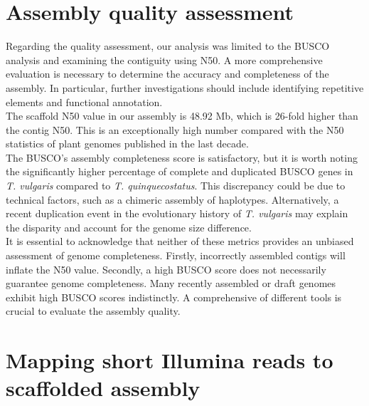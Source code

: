 \section*{Assembly quality assessment}

Regarding the quality assessment, our analysis was limited to the BUSCO analysis and examining the contiguity using N50. A more comprehensive evaluation is necessary to determine the accuracy and completeness of the assembly. In particular, further investigations should include identifying repetitive elements and functional annotation.\\

The scaffold N50 value in our assembly is 48.92 Mb, which is 26-fold higher than the contig N50. This is an exceptionally high number compared with the N50 statistics of plant genomes published in the last decade.~\cite{sunTwentyYearsPlant2022a}\\

The BUSCO's assembly completeness score is satisfactory, but it is worth noting the significantly higher percentage of complete and duplicated BUSCO genes in \textit{T. vulgaris} compared to \textit{T. quinquecostatus}. This discrepancy could be due to technical factors, such as a chimeric assembly of haplotypes. Alternatively, a recent duplication event in the evolutionary history of \textit{T. vulgaris} may explain the disparity and account for the genome size difference.~\cite{manniBUSCOAssessingGenomic2021}\\

It is essential to acknowledge that neither of these metrics provides an unbiased assessment of genome completeness. Firstly, incorrectly assembled contigs will inflate the N50 value. Secondly, a high BUSCO score does not necessarily guarantee genome completeness. Many recently assembled or draft genomes exhibit high BUSCO scores indistinctly. A comprehensive of different tools is crucial to evaluate the assembly quality.~\cite{mokhtarLargescaleAssessmentQuality2023} \\


\section*{Mapping short Illumina reads to scaffolded assembly}

